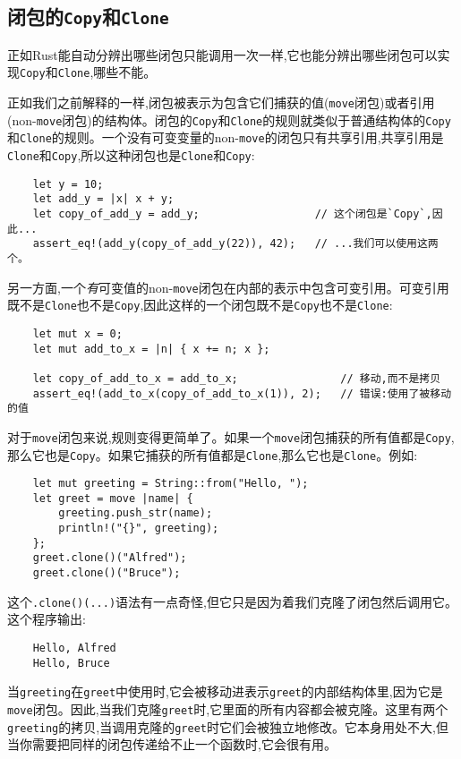 \subsection{闭包的\texttt{Copy}和\texttt{Clone}}
正如Rust能自动分辨出哪些闭包只能调用一次一样,它也能分辨出哪些闭包可以实现\texttt{Copy}和\texttt{Clone},哪些不能。

正如我们之前解释的一样,闭包被表示为包含它们捕获的值(\texttt{move}闭包)或者引用(non-\texttt{move}闭包)的结构体。闭包的\texttt{Copy}和\texttt{Clone}的规则就类似于普通结构体的\texttt{Copy}和\texttt{Clone}的规则。一个没有可变变量的non-\texttt{move}的闭包只有共享引用,共享引用是\texttt{Clone}和\texttt{Copy},所以这种闭包也是\texttt{Clone}和\texttt{Copy}:
\begin{verbatim}
    let y = 10;
    let add_y = |x| x + y;
    let copy_of_add_y = add_y;                  // 这个闭包是`Copy`,因此...
    assert_eq!(add_y(copy_of_add_y(22)), 42);   // ...我们可以使用这两个。
\end{verbatim}

另一方面,一个\emph{有}可变值的non-\texttt{move}闭包在内部的表示中包含可变引用。可变引用既不是\texttt{Clone}也不是\texttt{Copy},因此这样的一个闭包既不是\texttt{Copy}也不是\texttt{Clone}:
\begin{verbatim}
    let mut x = 0;
    let mut add_to_x = |n| { x += n; x };

    let copy_of_add_to_x = add_to_x;                // 移动,而不是拷贝
    assert_eq!(add_to_x(copy_of_add_to_x(1)), 2);   // 错误:使用了被移动的值
\end{verbatim}

对于\texttt{move}闭包来说,规则变得更简单了。如果一个\texttt{move}闭包捕获的所有值都是\texttt{Copy},那么它也是\texttt{Copy}。如果它捕获的所有值都是\texttt{Clone},那么它也是\texttt{Clone}。例如:
\begin{verbatim}
    let mut greeting = String::from("Hello, ");
    let greet = move |name| {
        greeting.push_str(name);
        println!("{}", greeting);
    };
    greet.clone()("Alfred");
    greet.clone()("Bruce");
\end{verbatim}

这个\texttt{.clone()(...)}语法有一点奇怪,但它只是因为着我们克隆了闭包然后调用它。这个程序输出:
\begin{verbatim}
    Hello, Alfred
    Hello, Bruce
\end{verbatim}

当\texttt{greeting}在\texttt{greet}中使用时,它会被移动进表示\texttt{greet}的内部结构体里,因为它是\texttt{move}闭包。因此,当我们克隆\texttt{greet}时,它里面的所有内容都会被克隆。这里有两个\texttt{greeting}的拷贝,当调用克隆的\texttt{greet}时它们会被独立地修改。它本身用处不大,但当你需要把同样的闭包传递给不止一个函数时,它会很有用。

